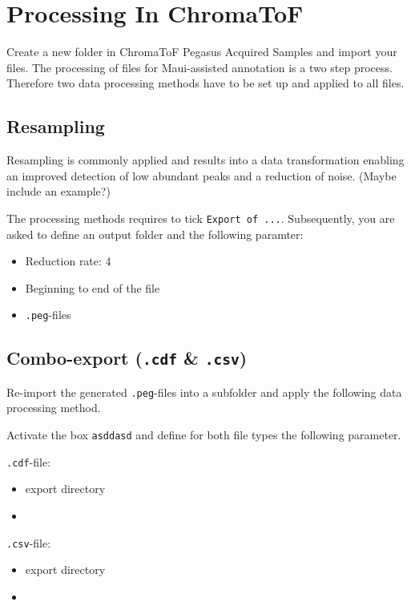 \documentclass[]{book}
\providecommand{\tightlist}{%
  \setlength{\itemsep}{0pt}\setlength{\parskip}{0pt}}
\theoremstyle{definition}
\theoremstyle{definition}
\theoremstyle{definition}
\theoremstyle{remark}
\begin{document}
\section{Processing In ChromaToF}\label{processing-in-chromatof}

Create a new folder in ChromaToF Pegasus Acquired Samples and import
your files. The processing of files for Maui-assisted annotation is a
two step process. Therefore two data processing methods have to be set
up and applied to all files.

\subsection{Resampling}\label{resampling}

Resampling is commonly applied and results into a data transformation
enabling an improved detection of low abundant peaks and a reduction of
noise. (Maybe include an example?)

The processing methods requires to tick \texttt{Export\ of\ ...}.
Subsequently, you are asked to define an output folder and the following
paramter:

\begin{itemize}
\tightlist
\item
  Reduction rate: 4
\item
  Beginning to end of the file
\item
  \texttt{.peg}-files
\end{itemize}

\subsection{\texorpdfstring{Combo-export (\texttt{.cdf} \&
\texttt{.csv})}{Combo-export (.cdf \& .csv)}}\label{combo-export-.cdf-.csv}

Re-import the generated \texttt{.peg}-files into a subfolder and apply
the following data processing method.

Activate the box \texttt{asddasd} and define for both file types the
following parameter.

\texttt{.cdf}-file:

\begin{itemize}
\item
  export directory
\item
\end{itemize}

\texttt{.csv}-file:

\begin{itemize}
\item
  export directory
\item
\end{itemize}
\end{document}
